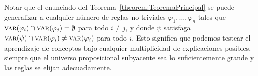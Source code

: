 Notar que el enunciado del Teorema~\ref{theorem:TeoremaPrincipal} se puede generalizar a cualquier número de reglas no triviales $\varphi_1, \dots, \varphi_n$ tales que $\textsc{var}(\varphi_i) \cap \textsc{var}(\varphi_j) = \emptyset$ para todo $i \neq j$, y donde $\psi$ satisfaga $\textsc{var}(\psi) \cap \textsc{var}(\varphi_i) \neq \textsc{var}(\varphi_i)$ para todo $i$. Esto significa que podemos testear el aprendizaje de conceptos bajo cualquier multiplicidad de explicaciones posibles, siempre que el universo proposicional subyacente sea lo suficientemente grande y las reglas se elijan adecuadamente.



